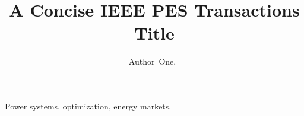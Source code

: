 \documentclass[journal]{IEEEtran}
\begin{document}
\title{A Concise IEEE PES Transactions Title}
\author{Author~One,~}
\maketitle

\begin{IEEEkeywords}
Power systems, optimization, energy markets.
\end{IEEEkeywords}






\end{document}
